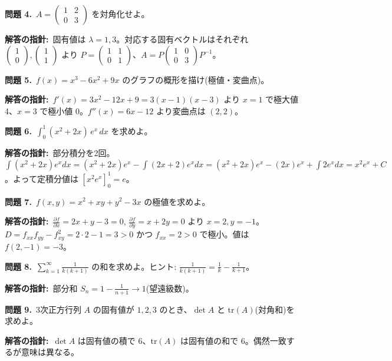 \documentclass{article}
\begin{document}
\textbf{問題 4.}\ \(A = \begin{pmatrix} 1 & 2 \\ 0 & 3 \end{pmatrix}\) を対角化せよ。

\textbf{解答の指針:}\ 固有値は \(\lambda = 1, 3\)。対応する固有ベクトルはそれぞれ \(\begin{pmatrix} 1 \\ 0 \end{pmatrix}, \begin{pmatrix} 1 \\ 1 \end{pmatrix}\) より \(P = \begin{pmatrix} 1 & 1 \\ 0 & 1 \end{pmatrix}\)、\(A = P \begin{pmatrix} 1 & 0 \\ 0 & 3 \end{pmatrix} P^{-1}\)。

\textbf{問題 5.}\ \(f(x) = x^3 - 6x^2 + 9x\) のグラフの概形を描け(極値・変曲点)。

\textbf{解答の指針:}\ \(f'(x) = 3x^2 - 12x + 9 = 3(x-1)(x-3)\) より \(x=1\) で極大値 4、\(x=3\) で極小値 0。\(f''(x) = 6x - 12\) より変曲点は \((2, 2)\)。

\textbf{問題 6.}\ \(\displaystyle \int_0^1 (x^2 + 2x)\, e^x\, dx\) を求めよ。

\textbf{解答の指針:}\ 部分積分を2回。\(\int (x^2+2x)e^x dx = (x^2+2x)e^x - \int (2x+2)e^x dx = (x^2+2x)e^x - (2x)e^x + \int 2e^x dx = x^2 e^x + C\)。よって定積分値は \([x^2 e^x]_0^1 = e\)。

\textbf{問題 7.}\ \(f(x, y) = x^2 + xy + y^2 - 3x\) の極値を求めよ。

\textbf{解答の指針:}\ \(\frac{\partial f}{\partial x} = 2x + y - 3 = 0\), \(\frac{\partial f}{\partial y} = x + 2y = 0\) より \(x = 2, y = -1\)。\(D = f_{xx} f_{yy} - f_{xy}^2 = 2 \cdot 2 - 1 = 3 > 0\) かつ \(f_{xx} = 2 > 0\) で極小。値は \(f(2, -1) = -3\)。

\textbf{問題 8.}\ \(\displaystyle \sum_{k=1}^{\infty} \frac{1}{k(k+1)}\) の和を求めよ。ヒント: \(\frac{1}{k(k+1)} = \frac{1}{k} - \frac{1}{k+1}\)。

\textbf{解答の指針:}\ 部分和 \(S_n = 1 - \frac{1}{n+1} \to 1\)(望遠級数)。

\textbf{問題 9.}\ 3次正方行列 \(A\) の固有値が \(1, 2, 3\) のとき、\(\det A\) と \(\mathrm{tr}(A)\)(対角和)を求めよ。

\textbf{解答の指針:}\ \(\det A\) は固有値の積で \(6\)、\(\mathrm{tr}(A)\) は固有値の和で \(6\)。偶然一致するが意味は異なる。
\end{document}
